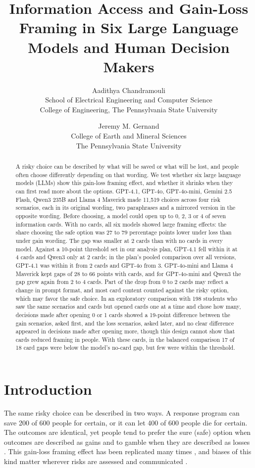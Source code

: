 \documentclass[11pt]{article}
\title{Information Access and Gain-Loss Framing in Six Large Language Models and Human Decision Makers}
\author{
  Aadithya Chandramouli\\
  School of Electrical Engineering and Computer Science\\
  College of Engineering, The Pennsylvania State University
  \and
  Jeremy M. Gernand\\
  College of Earth and Mineral Sciences\\
  The Pennsylvania State University
}
\date{}
\begin{document}
\maketitle
\begin{abstract}
A risky choice can be described by what will be saved or what will be lost, and people often choose differently depending on that wording. We test whether six large language models (LLMs) show this gain-loss framing effect, and whether it shrinks when they can first read more about the options. GPT-4.1, GPT-4o, GPT-4o-mini, Gemini 2.5 Flash, Qwen3 235B and Llama 4 Maverick made 11,519 choices across four risk scenarios, each in its original wording, two paraphrases and a mirrored version in the opposite wording. Before choosing, a model could open up to 0, 2, 3 or 4 of seven information cards. With no cards, all six models showed large framing effects: the share choosing the safe option was 27 to 79 percentage points lower under loss than under gain wording. The gap was smaller at 2 cards than with no cards in every model. Against a 10-point threshold set in our analysis plan, GPT-4.1 fell within it at 4 cards and Qwen3 only at 2 cards; in the plan's pooled comparison over all versions, GPT-4.1 was within it from 2 cards and GPT-4o from 3. GPT-4o-mini and Llama 4 Maverick kept gaps of 28 to 66 points with cards, and for GPT-4o-mini and Qwen3 the gap grew again from 2 to 4 cards. Part of the drop from 0 to 2 cards may reflect a change in prompt format, and most card content counted against the risky option, which may favor the safe choice. In an exploratory comparison with 198 students who saw the same scenarios and cards but opened cards one at a time and chose how many, decisions made after opening 0 or 1 cards showed a 19-point difference between the gain scenarios, asked first, and the loss scenarios, asked later, and no clear difference appeared in decisions made after opening more, though this design cannot show that cards reduced framing in people. With these cards, in the balanced comparison 17 of 18 card gaps were below the model's no-card gap, but few were within the threshold.
\end{abstract}

\section{Introduction}

The same risky choice can be described in two ways. A response program can save 200 of 600 people for certain, or it can let 400 of 600 people die for certain. The outcomes are identical, yet people tend to prefer the sure (safe) option when outcomes are described as gains and to gamble when they are described as losses \citep{tversky1981framing}. This gain-loss framing effect has been replicated many times \citep{kuhberger1998influence}, and biases of this kind matter wherever risks are assessed and communicated \citep{montibeller2015cognitive,gernand2023set}.
\end{document}
